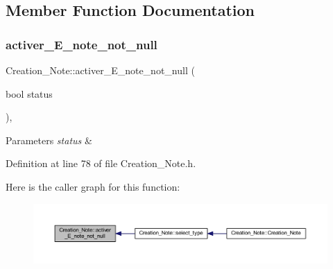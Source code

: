 \subsection{Member Function Documentation}
\mbox{\label{class_creation___note_ad786b2c2e3273160009e560a8de2ab6c}} 
\subsubsection{\texorpdfstring{activer\+\_\+\+E\+\_\+note\+\_\+not\+\_\+null}{activer\_E\_note\_not\_null}}
{\footnotesize\ttfamily Creation\+\_\+\+Note\+::activer\+\_\+\+E\+\_\+note\+\_\+not\+\_\+null (\begin{DoxyParamCaption}\item[{bool}]{status }\end{DoxyParamCaption})\hspace{0.3cm}{\ttfamily [inline]}, {\ttfamily [slot]}}


\begin{DoxyParams}{Parameters}
{\em status} & \\
\hline
\end{DoxyParams}


Definition at line 78 of file Creation\+\_\+\+Note.\+h.

Here is the caller graph for this function\+:\nopagebreak
\begin{figure}[H]
\begin{center}
\leavevmode
\includegraphics[width=350pt]{class_creation___note_ad786b2c2e3273160009e560a8de2ab6c_icgraph}
\end{center}
\end{figure}
\mbox{\label{class_creation___note_a4627e5957db87af2b7c43937857e9d6e}} 
